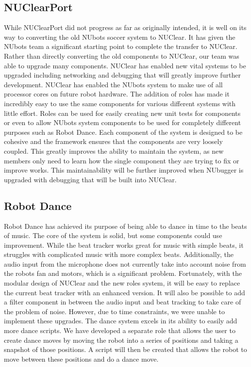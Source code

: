 \documentclass[english,12pt]{scrartcl}
\begin{document}
	\subsection{NUClearPort}
		While NUClearPort did not progress as far as originally intended, it is well on its way to converting the old NUbots soccer system to NUClear.
		It has given the NUbots team a significant starting point to complete the transfer to NUClear.
		Rather than directly converting the old components to NUClear, our team was able to upgrade many components.
		NUClear has enabled new vital systems to be upgraded including networking and debugging that will greatly improve further development.
		NUClear has enabled the NUbots system to make use of all processor cores on future robot hardware.
		The addition of roles has made it incredibly easy to use the same components for various different systems with little effort.
		Roles can be used for easily creating new unit tests for components or even to allow NUbots system components to be used for completely different purposes such as Robot Dance.
		Each component of the system is designed to be cohesive and the framework ensures that the components are very loosely coupled.
		This greatly improves the ability to maintain the system, as new members only need to learn how the single component they are trying to fix or improve works.
		This maintainability will be further improved when NUbugger is upgraded with debugging that will be built into NUClear. 
	
	\subsection{Robot Dance}
		Robot Dance has achieved its purpose of being able to dance in time to the beats of music.
		The core of the system is solid, but some components could use improvement.
		While the beat tracker works great for music with simple beats, it struggles with complicated music with more complex beats.
		Additionally, the audio input from the microphone does not currently take into account noise from the robots fan and motors, which is a significant problem.
		Fortunately, with the modular design of NUClear and the new roles system, it will be easy to replace the current beat tracker with an enhanced version.
		It will also be possible to add a filter component in between the audio input and beat tracking to take care of the problem of noise.
		However, due to time constraints, we were unable to implement these upgrades.
		The dance system excels in its ability to easily add more dance scripts.
		We have developed a separate role that allows the user to create dance moves by moving the robot into a series of positions and taking a snapshot of those positions.
		A script will then be created that allows the robot to move between these positions and do a dance move.
		
\end{document}
